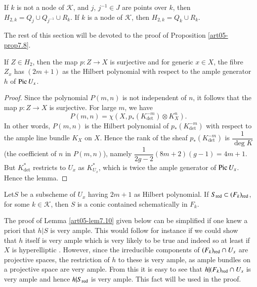 \setcounter{theorem}{7}
\begin{proposition}\label{art05-prop7.8}
If $k$ is not a node of $\mathscr{K}$, and $j$, $j^{-1}\in J$ are
points over $k$, then $H_{2,k}=Q_{j}\cup Q_{j^{-1}}\cup R_{k}$. If $k$ is
a node of $\mathscr{K}$, then $H_{2,k}=Q_{k}\cup R_{k}$. 
\end{proposition}

The rest of this section will be devoted to the proof of
Proposition \ref{art05-prop7.8}. 

\begin{lemma}\label{art05-lem7.9}
If $Z\in H_{2}$, then the map $p:Z\to X$ is surjective and for generic
$x\in X$, the fibre $Z_{x}$ has $(2m+1)$ as the Hilbert polynomial
with respect to the ample generator $h$ of $\operatorname{Pic} U_{x}$.
\end{lemma}

\begin{proof}
Since the polynomial $P(m,n)$ is not independent of $n$, it follows
that the map $p:Z\to X$ is surjective. For large $m$, we have
$$
P(m,n)=\chi(X,p_{*}(K^{-m}_{\det})\otimes K^{n}_{X}).
$$
In other words, $P(m,n)$ is the Hilbert polynomial of
$p_{*}(K^{-m}_{\det})$ with respect to the ample line bundle $K_{X}$
on $X$. Hence the rank of the sheaf $p_{*}(K^{-m}_{\det})$ is
$\dfrac{1}{\deg K}$ (the coefficient of $n$ in $P(m,n)$), namely
$\dfrac{1}{2g-2}(8m+2)(g-1)=4m+1$. But $K^{*}_{\det}$ restricts to
$U_{x}$ as $K^{*}_{U_{x}}$, which is twice the ample generator of
$\operatorname{Pic} U_{x}$. Hence the lemma.
\end{proof}

\begin{lemma}\label{art05-lem7.10}
Let\pageoriginale $S$ be a subscheme of $U_{x}$ having $2m+1$ as
Hilbert polynomial. If $S_{\operatorname{red}}\subset (F_{k})_{\operatorname{red}}$, for some
$k\in \mathscr{K}$, then $S$ is a conic contained schematically in
$F_{k}$. 
\end{lemma}

\begin{remark}\label{art05-rem7.11}
The proof of Lemma \ref{art05-lem7.10} given below can be simplified
if one knew a priori that $h|S$ is very ample. This would follow for
instance if we could show that $h$ itself is very ample which is very
likely to be true and indeed so at least if $X$ is
hyperelliptic \cite[5.10, II]{art05-key1}. However, since the
irreducible components of $(F_{k})_{\operatorname{red}}\cap U_{x}$ are projective
spaces, the restriction of $h$ to these is very ample, as ample
bundles on a projective space are very ample. From this it is easy to
see that $h|(F_{k})_{\operatorname{red}}\cap U_{x}$ is very ample and hence
$h|S_{\operatorname{red}}$ is very ample. This fact will be used in the proof.
\end{remark}

